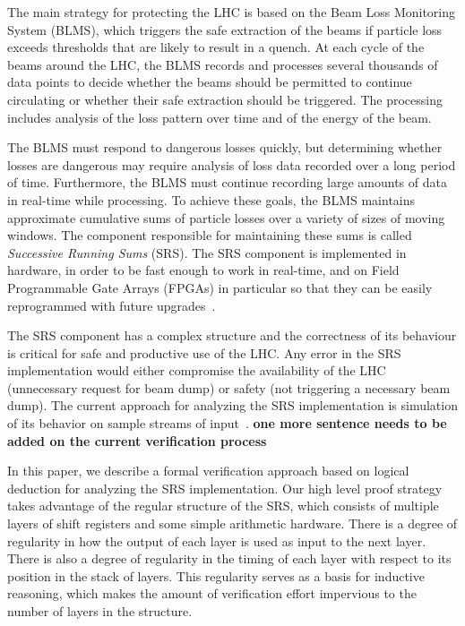 \documentclass{llncs}
\begin{document}
The main strategy for protecting the LHC is based on the Beam Loss Monitoring System (BLMS), which triggers the safe extraction of the beams if particle loss exceeds thresholds that are likely to result in a quench.
At each cycle of the beams around the LHC, the BLMS records and processes several thousands of data points to decide whether the beams should be permitted to continue circulating or whether their safe extraction should be triggered.
The processing includes analysis of the loss pattern over time and of the energy of the beam.

The BLMS must respond to dangerous losses quickly, but determining whether losses are dangerous may require analysis of loss data recorded over a long period of time.
Furthermore, the BLMS must continue recording large amounts of data in real-time while processing.
To achieve these goals, the BLMS maintains approximate cumulative sums of particle losses over a variety of sizes of moving windows.
The component responsible for maintaining these sums is called \emph{Successive Running Sums} (SRS).
The SRS component is implemented in hardware, in order to be fast enough to work in real-time, and on Field Programmable Gate Arrays (FPGAs) in particular so that they can be easily reprogrammed with future upgrades~\cite{Chris-FPGA}.

The SRS component has a complex structure and the correctness of its behaviour is critical for safe and productive use of the LHC.
Any error in the SRS implementation would either compromise the availability of the LHC (unnecessary request for beam dump) or safety (not triggering a necessary beam dump).
The current approach for analyzing the SRS implementation is simulation of its behavior on sample streams of input~\cite{}.
{\bf one more sentence needs to be added on the current verification process}

In this paper, we describe a formal verification approach based on logical deduction for analyzing the SRS implementation.
Our high level proof strategy takes advantage of the regular structure of the SRS, which consists of multiple layers of shift registers and some simple arithmetic hardware.
There is a degree of regularity in how the output of each layer is used as input to the next layer.
There is also a degree of regularity in the timing of each layer with respect to its position in the stack of layers.
This regularity serves as a basis for inductive reasoning, which makes the amount of verification effort impervious to the number of layers in the structure.
\end{document}
